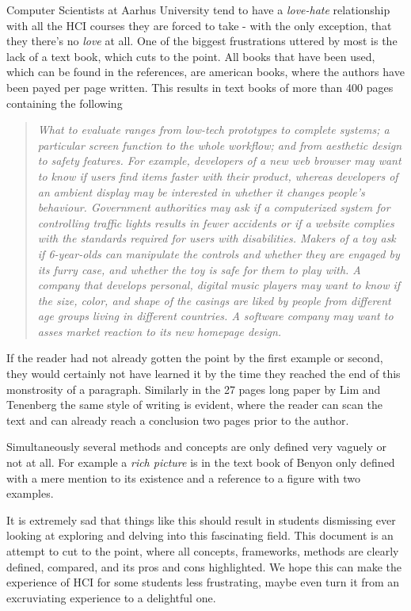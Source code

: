 Computer Scientists at Aarhus University tend to have a \emph{love-hate} relationship with all the HCI courses they are forced to take - with the only exception, that they there's no \emph{love} at all. One of the biggest frustrations uttered by most is the lack of a text book, which cuts to the point. All books that have been used, which can be found in the references, are american books, where the authors have been payed per page written. This results in text books of more than 400 pages containing the following

\blockcquote[p. 435]{rogers}{\it What to evaluate ranges from low-tech prototypes to complete systems; a particular screen function to the whole workflow; and from aesthetic design to safety features. For example, developers of a new web browser may want to know if users find items faster with their product, whereas developers of an ambient display may be interested in whether it changes people's behaviour. Government authorities may ask if a computerized system for controlling traffic lights results in fewer accidents or if a website complies with the standards required for users with disabilities. Makers of a toy ask if 6-year-olds can manipulate the controls and whether they are engaged by its furry case, and whether the toy is safe for them to play with. A company that develops personal, digital music players may want to know if the size, color, and shape of the casings are liked by people from different age groups living in different countries. A software company may want to asses market reaction to its new homepage design.}

\noindent If the reader had not already gotten the point by the first example or second, they would certainly not have learned it by the time they reached the end of this monstrosity of a paragraph. Similarly in the 27 pages long paper by Lim and Tenenberg \cite{lim} the same style of writing is evident, where the reader can scan the text and can already reach a conclusion two pages prior to the author.

Simultaneously several methods and concepts are only defined very vaguely or not at all. For example a \emph{rich picture} is in the text book of Benyon only defined with a mere mention to its existence and a reference to a figure with two examples. \cite[p. 51-52]{benyon_14}

It is extremely sad that things like this should result in students dismissing ever looking at exploring and delving into this fascinating field. This document is an attempt to cut to the point, where all concepts, frameworks, methods are clearly defined, compared, and its pros and cons highlighted. We hope this can make the experience of HCI for some students less frustrating, maybe even turn it from an excruviating experience to a delightful one.

